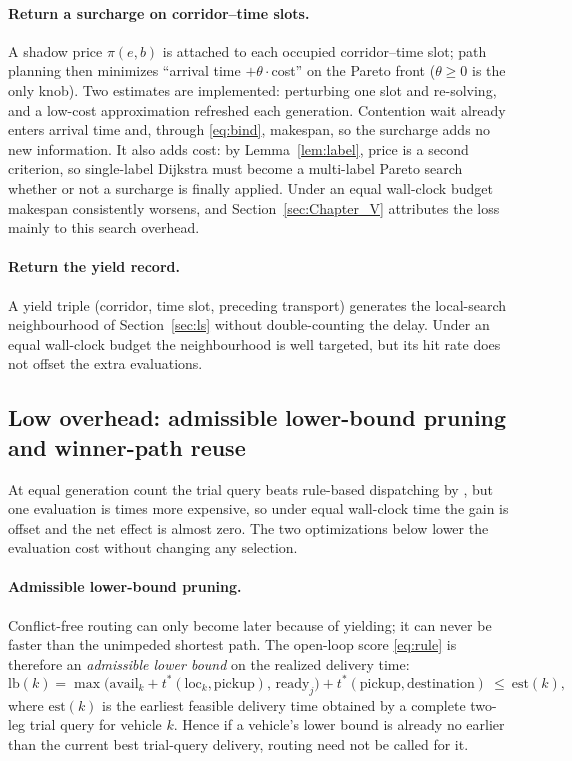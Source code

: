 \paragraph{Return a surcharge on corridor--time slots.}
A shadow price $\pi(e,b)$ is attached to each occupied corridor--time slot; path planning then minimizes ``arrival time $+\theta\cdot$cost'' on the Pareto front ($\theta\ge0$ is the only knob).
Two estimates are implemented: perturbing one slot and re-solving, and a low-cost approximation refreshed each generation.
Contention wait already enters arrival time and, through \eqref{eq:bind}, makespan, so the surcharge adds no new information.
It also adds cost: by Lemma~\ref{lem:label}, price is a second criterion, so single-label Dijkstra must become a multi-label Pareto search whether or not a surcharge is finally applied.
Under an equal wall-clock budget makespan consistently worsens, and Section~\ref{sec:Chapter_V} attributes the loss mainly to this search overhead.

\paragraph{Return the yield record.}
A yield triple (corridor, time slot, preceding transport) generates the local-search neighbourhood of Section~\ref{sec:ls} without double-counting the delay.
Under an equal wall-clock budget the neighbourhood is well targeted, but its hit rate does not offset the extra evaluations.

\subsection{Low overhead: admissible lower-bound pruning and winner-path reuse}
\label{sec:speedup}

At equal generation count the trial query beats rule-based dispatching by \GainProbeSameGen{}, but one evaluation is \CostMultBefore{} times more expensive, so under equal wall-clock time the gain is offset and the net effect is almost zero.
The two optimizations below lower the evaluation cost without changing any selection.

\paragraph{Admissible lower-bound pruning.}
Conflict-free routing can only become later because of yielding; it can never be faster than the unimpeded shortest path.
The open-loop score \eqref{eq:rule} is therefore an \emph{admissible lower bound} on the realized delivery time:
\begin{equation}
\label{eq:lb_dispatch}
\mathrm{lb}(k)=\max\bigl(\mathrm{avail}_k+t^{*}(\mathrm{loc}_k,\text{pickup}),\,
\mathrm{ready}_j\bigr)+t^{*}(\text{pickup},\text{destination})\ \le\ \mathrm{est}(k),
\end{equation}
where $\mathrm{est}(k)$ is the earliest feasible delivery time obtained by a complete two-leg trial query for vehicle $k$.
Hence if a vehicle's lower bound is already no earlier than the current best trial-query delivery, routing need not be called for it.

